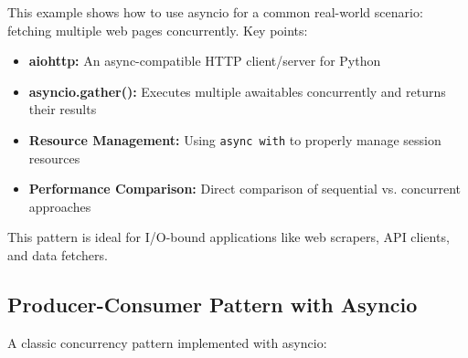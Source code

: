 \documentclass[12pt,letterpaper]{article}
\begin{document}
This example shows how to use asyncio for a common real-world scenario: fetching multiple web pages concurrently. Key points:

\begin{itemize}
    \item \textbf{\textcolor{pythonBlue}{aiohttp:}} An async-compatible HTTP client/server for Python
    \item \textbf{\textcolor{pythonBlue}{asyncio.gather():}} Executes multiple awaitables concurrently and returns their results
    \item \textbf{\textcolor{pythonBlue}{Resource Management:}} Using \texttt{async with} to properly manage session resources
    \item \textbf{\textcolor{pythonBlue}{Performance Comparison:}} Direct comparison of sequential vs. concurrent approaches
\end{itemize}

This pattern is ideal for I/O-bound applications like web scrapers, API clients, and data fetchers.

\subsection{Producer-Consumer Pattern with Asyncio}

A classic concurrency pattern implemented with asyncio:
\end{document}
